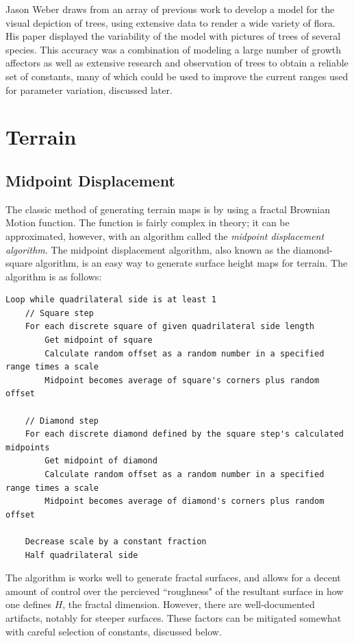 \documentclass{article}
\newcommand{\tab}{\hspace*{2em}}
\begin{document}
    \tab Jason Weber\cite{weber95} draws from an array of previous work to develop a model for the
visual depiction of trees, using extensive data to render a wide variety of flora. His paper
displayed the variability of the model with pictures of trees of several species. This accuracy was
a combination of modeling a
large number of growth affectors as well as extensive research and observation of trees to obtain
a reliable set of constants, many of which could be used to improve the current ranges used for
parameter variation, discussed later.

    \section{Terrain}
        \subsection{Midpoint Displacement}
    \tab The classic method of generating terrain maps is by using a fractal Brownian Motion
function\cite{mandelbrot68}. The function is fairly complex in theory; it can be approximated,
however, with an algorithm called the \emph{midpoint displacement algorithm}\cite{fournier82}. The
midpoint displacement algorithm, also known as the diamond-square algorithm, is an easy way to
generate surface height maps for terrain. The algorithm is as follows\cite{martz97}:
    \begin{verbatim}
Loop while quadrilateral side is at least 1
    // Square step
    For each discrete square of given quadrilateral side length
        Get midpoint of square
        Calculate random offset as a random number in a specified range times a scale
        Midpoint becomes average of square's corners plus random offset

    // Diamond step
    For each discrete diamond defined by the square step's calculated midpoints
        Get midpoint of diamond
        Calculate random offset as a random number in a specified range times a scale
        Midpoint becomes average of diamond's corners plus random offset

    Decrease scale by a constant fraction
    Half quadrilateral side

    \end{verbatim}

    \tab The algorithm is works well to generate fractal surfaces, and allows for a decent amount
of control over the percieved ``roughness" of the resultant surface in how one defines $H$, the fractal
dimension. However, there are well-documented artifacts, notably for steeper surfaces.
These factors can be mitigated somewhat with careful selection of constants, discussed below.
\end{document}
